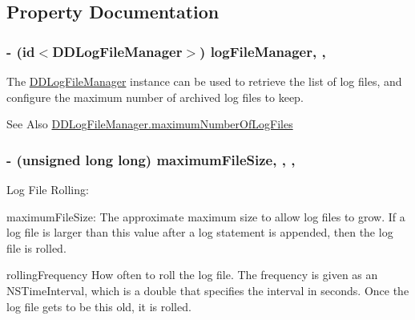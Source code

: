 \subsection{Property Documentation}
\hypertarget{interface_d_d_file_logger_a8dc888788d83e877aee47ad73684ce0a}{
\subsubsection[{log\-File\-Manager}]{\setlength{\rightskip}{0pt plus 5cm}-\/ (id$<${\bf D\-D\-Log\-File\-Manager}$>$) log\-File\-Manager\hspace{0.3cm}{\ttfamily [read]}, {\ttfamily [nonatomic]}, {\ttfamily [strong]}}}\label{interface_d_d_file_logger_a8dc888788d83e877aee47ad73684ce0a}
The \hyperlink{protocol_d_d_log_file_manager-p}{D\-D\-Log\-File\-Manager} instance can be used to retrieve the list of log files, and configure the maximum number of archived log files to keep.

\begin{DoxySeeAlso}{See Also}
\hyperlink{protocol_d_d_log_file_manager-p_acb282ecd7fa74b5c3ee03bbb7a710dc1}{D\-D\-Log\-File\-Manager.\-maximum\-Number\-Of\-Log\-Files} 
\end{DoxySeeAlso}
\hypertarget{interface_d_d_file_logger_a55f0ca92857d2a8ba54cba300a97b882}{
\subsubsection[{maximum\-File\-Size}]{\setlength{\rightskip}{0pt plus 5cm}-\/ (unsigned long long) maximum\-File\-Size\hspace{0.3cm}{\ttfamily [read]}, {\ttfamily [write]}, {\ttfamily [atomic]}, {\ttfamily [assign]}}}\label{interface_d_d_file_logger_a55f0ca92857d2a8ba54cba300a97b882}
Log File Rolling\-:

maximum\-File\-Size\-: The approximate maximum size to allow log files to grow. If a log file is larger than this value after a log statement is appended, then the log file is rolled.

rolling\-Frequency How often to roll the log file. The frequency is given as an N\-S\-Time\-Interval, which is a double that specifies the interval in seconds. Once the log file gets to be this old, it is rolled.

